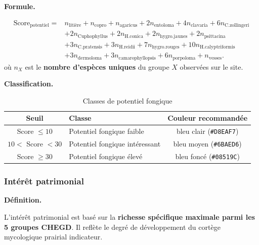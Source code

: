 \documentclass[11pt,a4paper]{article}
\begin{document}
\medskip
\noindent\textbf{Formule.}\par

\begin{formulebox}
  \[
  \begin{aligned}
    \text{Score}_{\text{potentiel}} ={}&
    n_{\text{litière}} + n_{\text{copro}} + n_{\text{agaricus}}
    + 2n_{\text{entoloma}} + 4n_{\text{clavaria}} + 6n_{\text{C.zollingeri}} \\
    &+ 2n_{\text{Cuphophyllus}} + 2n_{\text{H.conica}}
    + 2n_{\text{hygro.jaunes}} + 2n_{\text{psittacina}} \\
    &+ 3n_{\text{C.pratensis}} + 3n_{\text{H.reidii}}
    + 7n_{\text{hygro.rouges}} + 10n_{\text{H.calyptriformis}} \\
    &+ 3n_{\text{dermoloma}} + 3n_{\text{camarophyllopsis}}
    + 6n_{\text{porpoloma}} + n_{\text{vesses}}.
  \end{aligned}
  \]
  où $n_X$ est le \textbf{nombre d'espèces uniques} du groupe $X$ observées sur le site.
\end{formulebox}

\medskip
\noindent\textbf{Classification.}\par

\begin{table}[htbp]
  \centering
  \caption{Classes de potentiel fongique}
  \begin{tabular}{clc}
    \toprule
    \textbf{Seuil} & \textbf{Classe} & \textbf{Couleur recommandée} \\
    \midrule
    Score $\leq 10$       & Potentiel fongique faible       & bleu clair (\texttt{\#D8EAF7}) \\
    $10 <$ Score $< 30$   & Potentiel fongique intéressant  & bleu moyen (\texttt{\#6BAED6}) \\
    Score $\geq 30$       & Potentiel fongique élevé        & bleu foncé (\texttt{\#08519C}) \\
    \bottomrule
  \end{tabular}
\end{table}

\subsubsection{Intérêt patrimonial}

\medskip
\noindent\textbf{Définition.}\par

L'intérêt patrimonial est basé sur la \textbf{richesse spécifique maximale parmi les 5 groupes
CHEGD}. Il reflète le degré de développement du cortège mycologique prairial indicateur.
\end{document}
